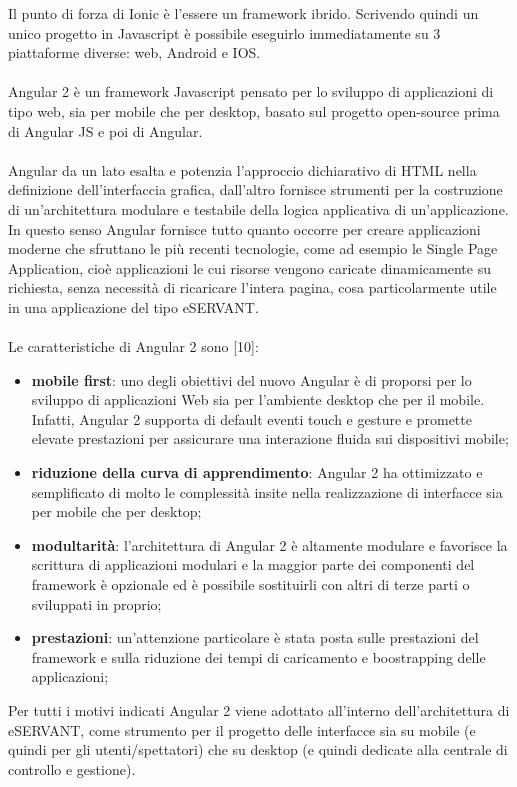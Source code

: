 Il punto di forza di Ionic è l’essere un framework ibrido. Scrivendo quindi un unico progetto in Javascript è possibile eseguirlo immediatamente su 3 piattaforme diverse: web, Android e IOS.
\paragraph{}

Angular 2 è un framework Javascript pensato per lo sviluppo di applicazioni di tipo web, sia per mobile che per desktop, basato sul progetto open-source prima di Angular JS e poi di Angular.
\paragraph{}

Angular da un lato esalta e potenzia l’approccio dichiarativo di HTML nella definizione
dell’interfaccia grafica, dall’altro fornisce strumenti per la costruzione di un’architettura modulare e testabile della logica applicativa di un’applicazione.
In questo senso Angular fornisce tutto quanto occorre per creare applicazioni moderne che
sfruttano le più recenti tecnologie, come ad esempio le Single Page Application, cioè
applicazioni le cui risorse vengono caricate dinamicamente su richiesta, senza necessità di
ricaricare l’intera pagina, cosa particolarmente utile in una applicazione del tipo eSERVANT.
\paragraph{}

Le caratteristiche di Angular 2 sono [10]:

\begin{itemize}
    \item  \textbf{mobile first}: uno degli obiettivi del nuovo Angular è di proporsi per lo
    sviluppo di applicazioni Web sia per l’ambiente desktop che per il mobile.
    Infatti, Angular 2 supporta di default eventi touch e gesture e promette
    elevate prestazioni per assicurare una interazione fluida sui dispositivi
    mobile;
    \item \textbf{riduzione della curva di apprendimento}: Angular 2 ha ottimizzato e
    semplificato di molto le complessità insite nella realizzazione di interfacce
    sia per mobile che per desktop;
    \item \textbf{modultarità}: l’architettura di Angular 2 è altamente modulare e favorisce la
    scrittura di applicazioni modulari e la maggior parte dei componenti del
    framework è opzionale ed è possibile sostituirli con altri di terze parti o
    sviluppati in proprio;
    \item \textbf{prestazioni}: un’attenzione particolare è stata posta sulle prestazioni del
    framework e sulla riduzione dei tempi di caricamento e boostrapping delle
    applicazioni;
\end{itemize}

Per tutti i motivi indicati Angular 2 viene adottato all’interno dell’architettura di
eSERVANT, come strumento per il progetto delle interfacce sia su mobile (e quindi per
gli utenti/spettatori) che su desktop (e quindi dedicate alla centrale di controllo e
gestione).
